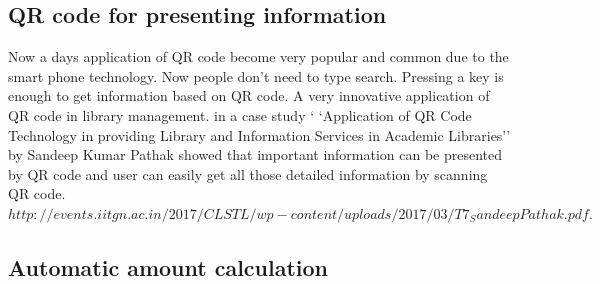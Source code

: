 \documentclass{sigchi}
\begin{document}
\subsection{QR code for presenting information}
Now a days application of QR code become very popular and common due to the smart phone technology. Now people don't need to type search. Pressing a key is enough to get information based on QR code. A very innovative application of QR code in library management. in a case study ` `Application of QR Code Technology in providing Library and Information Services in Academic Libraries'' by  Sandeep
Kumar Pathak showed that important information can be presented by QR code and user can easily get all those detailed information by scanning QR code. $http://events.iitgn.ac.in/2017/CLSTL/wp-content/uploads/2017/03/T7_SandeepPathak.pdf.$
\subsection{Automatic amount calculation}
\end{document}
